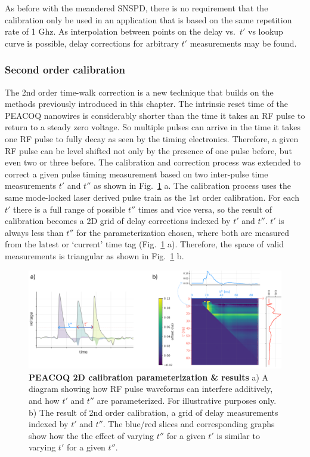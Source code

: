 \documentclass[11pt]{caltech_thesis} %
\begin{document}
As before with the meandered SNSPD, there is no requirement that the calibration only be used in an application that is based on the same repetition rate of 1 Ghz. As interpolation between points on the delay vs.~$t'$ vs lookup curve is possible, delay corrections for arbitrary $t'$ measurements may be found.

\hypertarget{second-order-calibration}{%
\subsubsection{Second order calibration}\label{second-order-calibration}}

The 2nd order time-walk correction is a new technique that builds on the methods previously introduced in this chapter. The intrinsic reset time of the PEACOQ nanowires is considerably shorter than the time it takes an RF pulse to return to a steady zero voltage. So multiple pulses can arrive in the time it takes one RF pulse to fully decay as seen by the timing electronics. Therefore, a given RF pulse can be level shifted not only by the presence of one pulse before, but even two or three before. The calibration and correction process was extended to correct a given pulse timing measurement based on two inter-pulse time measurements $t'$ and $t''$ as shown in Fig.~\ref{fig:order_2nd} a. The calibration process uses the same mode-locked laser derived pulse train as the 1st order calibration. For each $t'$ there is a full range of possible $t''$ times and vice versa, so the result of calibration becomes a 2D grid of delay corrections indexed by $t'$ and $t''$. $t'$ is always less than $t''$ for the parameterization chosen, where both are measured from the latest or `current' time tag (Fig.~\ref{fig:order_2nd} a). Therefore, the space of valid measurements is triangular as shown in Fig.~\ref{fig:order_2nd} b.

\hypertarget{fig:order_2nd}{%
\begin{figure}
\centering
\includegraphics[width=1\textwidth,height=\textheight]{./chapter_03/figs/SOM_Figure_order_2nd_v1_light.png}
\caption[{PEACOQ 2D calibration parameterization \& results}]{\textbf{PEACOQ 2D calibration parameterization \& results} a) A diagram showing how RF pulse waveforms can interfere additively, and how $t'$ and $t''$ are parameterized. For illustrative purposes only. b) The result of 2nd order calibration, a grid of delay measurements indexed by $t'$ and $t''$. The blue/red slices and corresponding graphs show how the the effect of varying $t''$ for a given $t'$ is similar to varying $t'$ for a given $t''$.}
\label{fig:order_2nd}
\end{figure}
}
\end{document}
